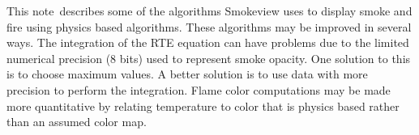 \documentclass[11pt]{article}
\newcommand{\paper}{note}
\begin{document}
This \paper\ describes some of the algorithms Smokeview uses to display
smoke and fire using physics based algorithms. These algorithms
may be improved in several ways. The integration of the RTE equation can have problems
due to the limited numerical precision (8 bits) used to represent smoke opacity.
One solution to this is to choose maximum values.  A better solution is to use data with
more precision to perform the integration. Flame color computations may be made more quantitative by
relating temperature to color that is physics based rather than an assumed
color map.



\end{document}
